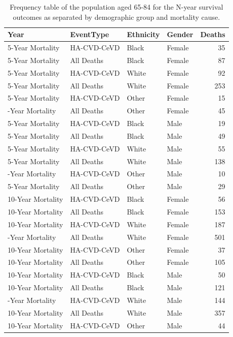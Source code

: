 \documentclass[
]{article}
\begin{document}
\begin{table}

\caption{\label{tab:DeathFreq2}Frequency table of the population aged 65-84 for the N-year survival outcomes as separated by demographic group and mortality cause.}
\centering
\begin{tabular}[t]{llllr}
\toprule
Year & EventType & Ethnicity & Gender & Deaths\\
\midrule
5-Year Mortality & HA-CVD-CeVD & Black & Female & 35\\
5-Year Mortality & All Deaths & Black & Female & 87\\
5-Year Mortality & HA-CVD-CeVD & White & Female & 92\\
5-Year Mortality & All Deaths & White & Female & 253\\
5-Year Mortality & HA-CVD-CeVD & Other & Female & 15\\
\addlinespace
5-Year Mortality & All Deaths & Other & Female & 45\\
5-Year Mortality & HA-CVD-CeVD & Black & Male & 19\\
5-Year Mortality & All Deaths & Black & Male & 49\\
5-Year Mortality & HA-CVD-CeVD & White & Male & 55\\
5-Year Mortality & All Deaths & White & Male & 138\\
\addlinespace
5-Year Mortality & HA-CVD-CeVD & Other & Male & 10\\
5-Year Mortality & All Deaths & Other & Male & 29\\
10-Year Mortality & HA-CVD-CeVD & Black & Female & 56\\
10-Year Mortality & All Deaths & Black & Female & 153\\
10-Year Mortality & HA-CVD-CeVD & White & Female & 187\\
\addlinespace
10-Year Mortality & All Deaths & White & Female & 501\\
10-Year Mortality & HA-CVD-CeVD & Other & Female & 37\\
10-Year Mortality & All Deaths & Other & Female & 105\\
10-Year Mortality & HA-CVD-CeVD & Black & Male & 50\\
10-Year Mortality & All Deaths & Black & Male & 121\\
\addlinespace
10-Year Mortality & HA-CVD-CeVD & White & Male & 144\\
10-Year Mortality & All Deaths & White & Male & 357\\
10-Year Mortality & HA-CVD-CeVD & Other & Male & 44\\

\end{tabular}
\end{table}
\end{document}
